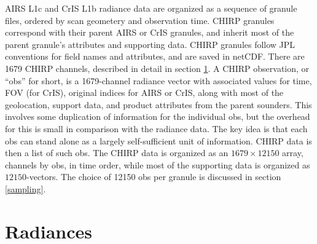 \documentclass[12pt]{article}
\begin{document}
AIRS L1c and CrIS L1b radiance data are organized as a sequence of
granule files, ordered by scan geometery and observation time.
CHIRP granules correspond with their parent AIRS or CrIS granules,
and inherit most of the parent granule's attributes and supporting
data.  CHIRP granules follow JPL conventions for field names and
attributes, and are saved in netCDF.  There are 1679 CHIRP channels,
described in detail in section \ref{rad}.  A CHIRP observation, or
``obs'' for short, is a 1679-channel radiance vector with associated
values for time, FOV (for CrIS), original indices for AIRS or CrIS,
along with most of the geolocation, support data, and product
attributes from the parent sounders.  This involves some duplication
of information for the individual obs, but the overhead for this is
small in comparison with the radiance data.  The key idea is that
each obs can stand alone as a largely self-sufficient unit of
information.  CHIRP data is then a list of such obs.  The CHIRP data
is organized as an $1679 \times 12150$ array, channels by obs, in
time order, while most of the supporting data is organized as
$12150$-vectors.  The choice of 12150 obs per granule is discussed
in section \ref{sampling}.

\section{Radiances}
\label{rad}
\end{document}
